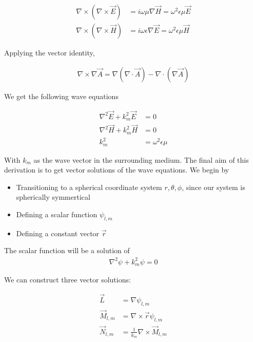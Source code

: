             \begin{align}
                \nabla \times (\nabla \times \vec{E}) &= i\omega\mu \nabla \vec{H} = \omega^2 \epsilon\mu\vec{E} \\
                \nabla \times (\nabla \times \vec{H}) &= i\omega\epsilon \nabla \vec{E} = \omega^2 \epsilon\mu\vec{H}
            \end{align}

            Applying the vector identity,

            \begin{align}
                \nabla \times \nabla \vec{A} = \nabla (\nabla \cdot \vec{A}) - \nabla \cdot (\nabla\vec{A})
            \end{align}

            We get the following wave equations

            \begin{align}
                \nabla^2\vec{E} + k^2_m\vec{E} &= 0 \label{mie:waveE}\\
                \nabla^2\vec{H} + k^2_m\vec{H} &= 0 \label{mie:waveH}\\
                k^2_m &= \omega^2\epsilon\mu \label{mie:kvec}
            \end{align}

            With $k_m$ as the wave vector in the surrounding medium. The final aim of this derivation is to get vector solutions
            of the wave equations. We begin by
            \begin{itemize}
                \item Transitioning to a spherical coordinate system ${r, \theta, \phi}$, since our system is spherically symmertical
                \item Defining a scalar function $\psi_{l,m}$
                \item Defining a constant vector $\vec{r}$
            \end{itemize}

            The scalar function will be a solution of
            \begin{align}
                \nabla^2\psi + k^2_m\psi = 0 \label{mie:scalar}
            \end{align}

            We can construct three vector solutions:

            \begin{align}
                \vec{L} &= \nabla\psi_{l,m} \\
                \vec{M}_{l,m} &= \nabla\times\vec{r}\psi_{l,m} \\
                \vec{N}_{l,m} &= \frac{1}{k_m}\nabla\times\vec{M}_{l,m}
            \end{align}

